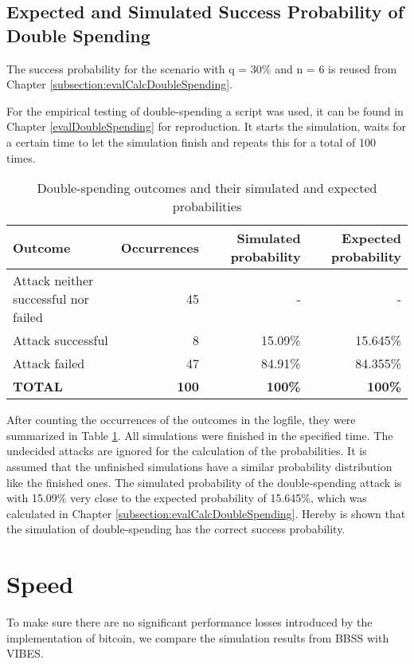 \subsection{Expected and Simulated Success Probability of Double Spending}
\label{subsection:evalDoubleSpending}
The success probability for the scenario with q = 30\% and n = 6 is reused from Chapter \ref{subsection:evalCalcDoubleSpending}.

For the empirical testing of double-spending a script was used, it can be found in Chapter \ref{evalDoubleSpending} for reproduction. It starts the simulation, waits for a certain time to let the simulation finish and repeats this for a total of 100 times.

\begin{table}[ht]
\caption{Double-spending outcomes and their simulated and expected probabilities\label{table:doubleSpendingSimulatedAndExpected}}
\centering
\begin{adjustbox}{width=1\textwidth}
    \begin{tabular}{| l | r | r | r |}
    \hline
    \textbf{Outcome} & \textbf{Occurrences} & \textbf{Simulated probability} & \textbf{Expected probability} \\ \hline
    Attack neither successful nor failed & 45 & - & - \\ \hline
    Attack successful & 8 & 15.09\% & 15.645\% \\ \hline
    Attack failed & 47 & 84.91\% & 84.355\% \\ \hline
    \textbf{TOTAL} & \textbf{100} & \textbf{100\%} & \textbf{100\%} \\ \hline
    \end{tabular}
\end{adjustbox}
\end{table}

After counting the occurrences of the outcomes in the logfile, they were summarized in Table \ref{table:doubleSpendingSimulatedAndExpected}. All simulations were finished in the specified time. The undecided attacks are ignored for the calculation of the probabilities. It is assumed that the unfinished simulations have a similar probability distribution like the finished ones. The simulated probability of the double-spending attack is with 15.09\% very close to the expected probability of 15.645\%, which was calculated in Chapter \ref{subsection:evalCalcDoubleSpending}. Hereby is shown that the simulation of double-spending has the correct success probability.

\section{Speed}
To make sure there are no significant performance losses introduced by the implementation of bitcoin, we compare the simulation results from BBSS with VIBES.


